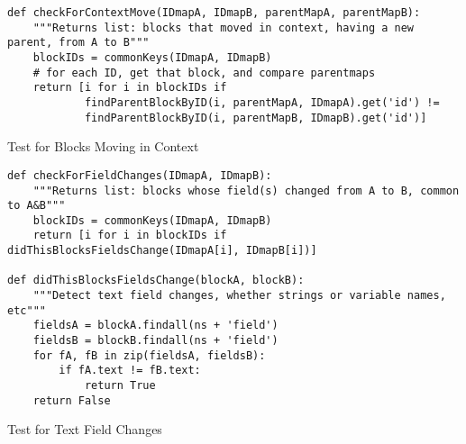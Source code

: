 \begin{listing}[]
\begin{verbatim}
def checkForContextMove(IDmapA, IDmapB, parentMapA, parentMapB):
    """Returns list: blocks that moved in context, having a new parent, from A to B"""
    blockIDs = commonKeys(IDmapA, IDmapB)
    # for each ID, get that block, and compare parentmaps
    return [i for i in blockIDs if
            findParentBlockByID(i, parentMapA, IDmapA).get('id') !=
            findParentBlockByID(i, parentMapB, IDmapB).get('id')]
\end{verbatim}
\caption{Test for Blocks Moving in Context}
\end{listing}

\begin{listing}[]
\begin{verbatim}
def checkForFieldChanges(IDmapA, IDmapB):
    """Returns list: blocks whose field(s) changed from A to B, common to A&B"""
    blockIDs = commonKeys(IDmapA, IDmapB)
    return [i for i in blockIDs if didThisBlocksFieldsChange(IDmapA[i], IDmapB[i])]

def didThisBlocksFieldsChange(blockA, blockB):
    """Detect text field changes, whether strings or variable names, etc"""
    fieldsA = blockA.findall(ns + 'field')
    fieldsB = blockB.findall(ns + 'field')
    for fA, fB in zip(fieldsA, fieldsB):
        if fA.text != fB.text:
            return True
    return False
\end{verbatim}
\caption{Test for Text Field Changes}
\end{listing}

